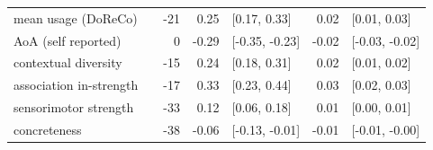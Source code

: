 \begin{table}[ht]
\begin{tabular}{llrrlrl}
  mean usage (DoReCo) &  & -21 & 0.25 & [0.17, 0.33] & 0.02 & [0.01, 0.03] \\ 
  AoA (self reported) &  & 0 & -0.29 & [-0.35, -0.23] & -0.02 & [-0.03, -0.02] \\ 
  contextual diversity &  & -15 & 0.24 & [0.18, 0.31] & 0.02 & [0.01, 0.02] \\ 
  association in-strength &  & -17 & 0.33 & [0.23, 0.44] & 0.03 & [0.02, 0.03] \\ 
  sensorimotor strength &  & -33 & 0.12 & [0.06, 0.18] & 0.01 & [0.00, 0.01] \\ 
  concreteness &  & -38 & -0.06 & [-0.13, -0.01] & -0.01 & [-0.01, -0.00] \\ 
   \hline
\end{tabular}
\end{table}
